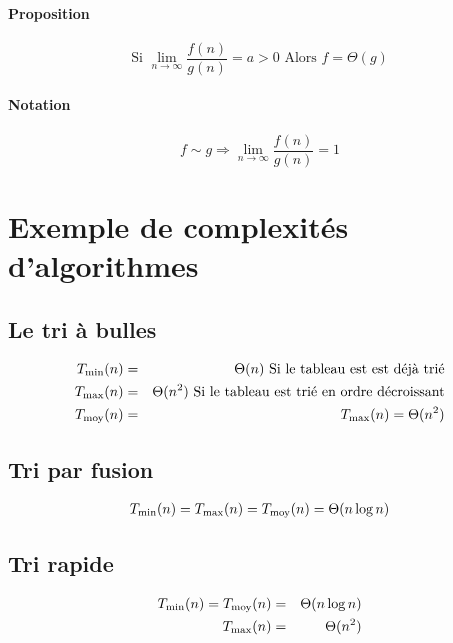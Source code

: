 \paragraph{Proposition}
$$\textrm{Si } \lim_{n \rightarrow \infty} \frac{f(n)}{g(n)} = a > 0 \textrm{ Alors }f = \Theta (g)$$

\paragraph{Notation} $$f \sim g \Rightarrow \lim_{n\rightarrow \infty} \frac{f(n)}{g(n)} = 1$$
\section{Exemple de complexités d'algorithmes}
\subsection{Le tri à bulles}
\begin{eqnarray*}
	T_{\min} (n) &=& \Theta (n) \textrm{ Si le tableau est est déjà trié}\\
	T_{\max}(n) &=& \Theta(n^2) \textrm{ Si le tableau est trié en ordre décroissant}\\
	T_{\textrm{moy}}(n) &=& T_{\max}(n) = \Theta(n^2)\\
\end{eqnarray*}
\subsection{Tri par fusion}
\begin{eqnarray*}
	T_{\min}(n) = T_{\max}(n) = T_{\textrm{moy}}(n) = \Theta (n\log n)
\end{eqnarray*}
\subsection{Tri rapide}
\begin{eqnarray*}
	T_{\min}(n) = T_{\textrm{moy}}(n) &=& \Theta (n \log n)\\
	T_{\max}(n) &=& \Theta(n^2)
\end{eqnarray*}

